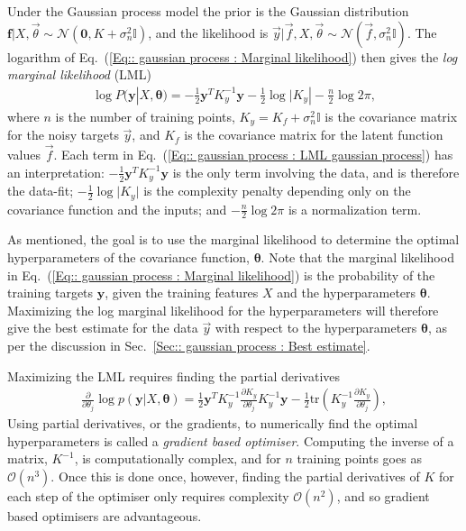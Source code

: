 \documentclass[twoside,english]{uiofysmaster}
\begin{document}
{{Under the Gaussian process model the prior is the Gaussian distribution $\textbf{f}| X, \vec{\theta} \sim \mathcal{N}(\textbf{0}, K + \sigma^2_n \mathbb{I})$, and the likelihood is $\vec{y} | \vec{f}, X, \vec{\theta} \sim \mathcal{N}(\vec{f}, \sigma_n^2 \mathbb{I})$. The logarithm of Eq.~(\ref{Eq:: gaussian process : Marginal likelihood}) then gives the \textit{log marginal likelihood} (LML) \cite{rasmussen2006gaussian} 
\begin{align}\label{Eq:: gaussian process : LML gaussian process}
\log P(\textbf{y}|X, \boldsymbol{\theta}) = - \frac{1}{2} \textbf{y}^T K_y^{-1} \textbf{y} - \frac{1}{2} \log \big|K_y| - \frac{n}{2} \log 2 \pi,
\end{align}
where $n$ is the number of training points, $K_y = K_f + \sigma_n^2 \mathbb{I}$ is the covariance matrix for the noisy targets $\vec{y}$, and $K_f$ is the covariance matrix for the latent function values $\vec{f}$. Each term in Eq.~(\ref{Eq:: gaussian process : LML gaussian process}) has an interpretation: $- \frac{1}{2} \textbf{y}^T K_y^{-1} \textbf{y}$ is the only term involving the data, and is therefore the data-fit; $-\frac{1}{2} \log \big| K_y \big|$ is the complexity penalty depending only on the covariance function and the inputs; and $- \frac{n}{2} \log 2 \pi$ is a normalization term. 



As mentioned, the goal is to use the marginal likelihood to determine the optimal hyperparameters of the covariance function, $\boldsymbol{\theta}$. Note that the marginal likelihood in Eq.~(\ref{Eq:: gaussian process : Marginal likelihood}) is the probability of the training targets $\textbf{y}$, given the training features $X$ and the hyperparameters $\boldsymbol{\theta}$. Maximizing the log marginal likelihood for the hyperparameters will therefore give the best estimate for the data $\vec{y}$ with respect to the hyperparameters $\boldsymbol{\theta}$, as per the discussion in Sec.~\ref{Sec:: gaussian process : Best estimate}. 

Maximizing the LML requires finding the partial derivatives 
\begin{align}
\frac{\partial}{\partial \theta_j}
 \log p(\textbf{y}|X, \boldsymbol{\theta}) = \frac{1}{2} \textbf{y}^T K_y^{-1} \frac{\partial K_y}{\partial \theta_j} K_y^{-1} \textbf{y} - \frac{1}{2} \text{tr} (K_y^{-1} \frac{\partial K_y}{\partial \theta_j}),
\end{align}
Using partial derivatives, or the gradients, to numerically find the optimal hyperparameters is called a \textit{gradient based optimiser}. Computing the inverse of a matrix, $K^{-1}$, is computationally complex, and for $n$ training points goes as $\mathcal{O}(n^3)$. Once this is done once, however, finding the partial derivatives of $K$ for each step of the optimiser only requires complexity $\mathcal{O}(n^2)$, and so gradient based optimisers are advantageous.

}}
\end{document}
